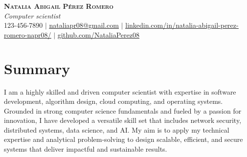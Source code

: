 \documentclass[letterpaper,11pt]{article}
\begin{document}

\begin{center}
    \textbf{\Huge \scshape Natalia Abigail Pérez Romero} \\ \vspace{1pt}
    \small \textit{Computer scientist} \\
    123-456-7890 $|$ \href{mailto:nataliapr08@gmail.com}{\underline{nataliapr08@gmail.com}} $|$ 
    \href{www.linkedin.com/in/natalia-abigail-perez-romero-napr08}{\underline{linkedin.com/in/natalia-abigail-perez-romero-napr08/}} $|$
    \href{https://github.com/NataliaPerez08}{\underline{github.com/NataliaPerez08}}
\end{center}

\section*{Summary}
I am a highly skilled and driven computer scientist with expertise in software development, algorithm design, cloud computing, and operating systems. Grounded in strong computer science fundamentals and fueled by a passion for innovation, I have developed a versatile skill set that includes network security, distributed systems, data science, and AI. My aim is to apply my technical expertise and analytical problem-solving to design scalable, efficient, and secure systems that deliver impactful and sustainable results.

\end{document}
